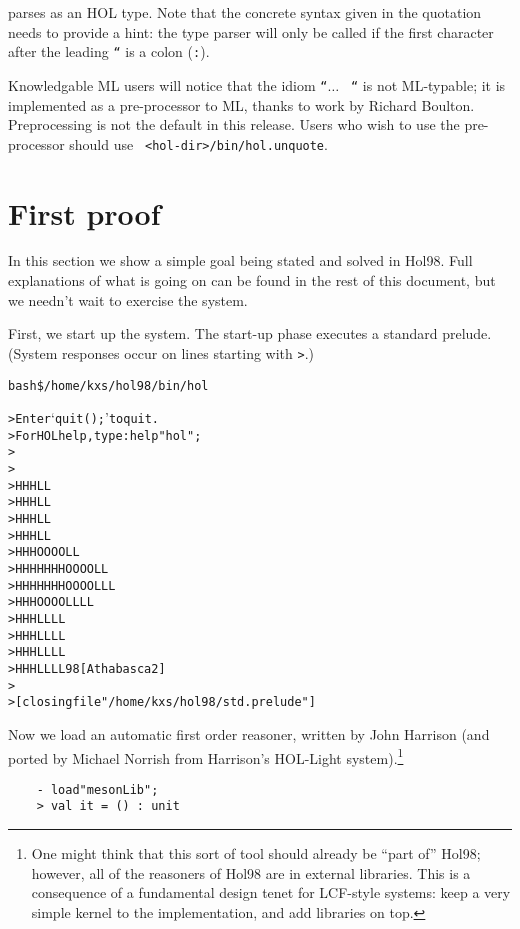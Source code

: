 \documentclass[12pt,fleqn,a4paper]{report}
\begin{document}
\noindent parses as an HOL type. Note that the concrete syntax given in
the quotation needs to provide a hint: the type parser will only be
called if the first character after the leading {\tt ``} is a colon (\verb+:+).

Knowledgable ML users will notice that the idiom {\tt ``}$\ldots$ {\tt
  ``} is not ML-typable; it is implemented as a pre-processor to ML,
thanks to work by Richard Boulton. Preprocessing is not the default in
this release. Users who wish to use the pre-processor should use {\tt
  <hol-dir>/bin/hol.unquote}.

\section{First proof}

In this section we show a simple goal being stated and solved in
Hol98. Full explanations of what is going on can be found in the rest of
this document, but we needn't wait to exercise the system.

First, we start up the system. The start-up phase executes a standard
prelude. (System responses occur on lines starting with \verb+>+.)

\begin{alltt}

     bash\$ /home/kxs/hol98/bin/hol

>    Enter `quit();' to quit.
>    For HOL help, type: help "hol";
>
>
>        HHH                 LL
>        HHH                  LL
>        HHH                   LL
>        HHH                    LL
>        HHH          OOOO       LL
>        HHHHHHH     OO  OO       LL
>        HHHHHHH     OO  OO       LLL
>        HHH          OOOO        LLLL
>        HHH                     LL  LL
>        HHH                    LL    LL
>        HHH                   LL      LL
>        HHH                  LL        LL98 [Athabasca 2]
>
>    [closing file "/home/kxs/hol98/std.prelude"]

\end{alltt}

Now we load an automatic first order reasoner, written by John
Harrison (and ported by Michael Norrish from Harrison's HOL-Light
system).\footnote{One might think that this sort of tool should
  already be ``part of'' Hol98; however, all of the reasoners of Hol98
  are in external libraries. This is a consequence of a fundamental
  design tenet for LCF-style systems: keep a very simple kernel to the
  implementation, and add libraries on top.}
\begin{verbatim}
    - load"mesonLib";
    > val it = () : unit
\end{verbatim}
\end{document}
